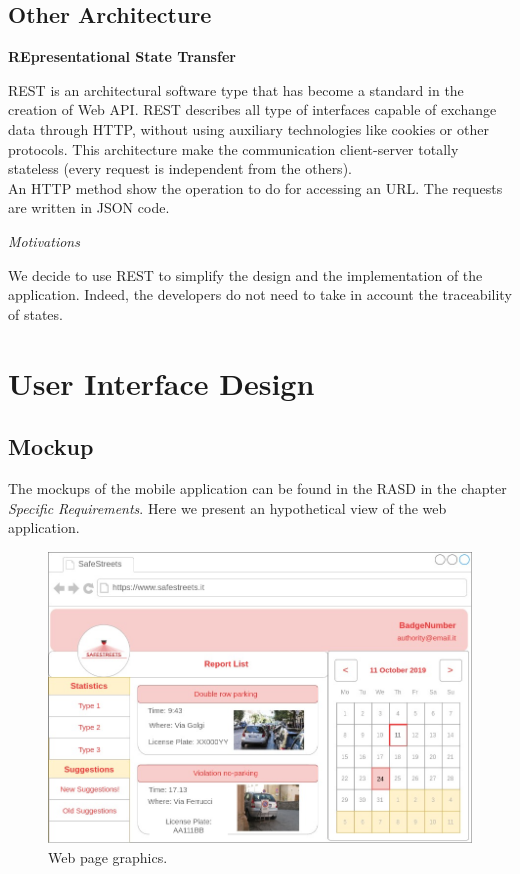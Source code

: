\documentclass{report}
\begin{document}
\section{Other Architecture}
\begin{center}\large{\textbf{REpresentational State Transfer}}\end{center}
REST is an architectural software type that has become a standard in the creation of Web API. REST describes all type of interfaces capable of exchange data through HTTP, without using auxiliary technologies like cookies or other protocols. This architecture make the communication client-server totally stateless (every request is independent from the others).\\ An HTTP method show the operation to do for accessing an URL. The requests are written in JSON code.
\begin{center}\large{\textit{Motivations}}\end{center}
We decide to use REST to simplify the design and the implementation of the application. Indeed, the developers do not need to take in account the traceability of states.

\chapter{User Interface Design}
\section{Mockup}
The mockups of the mobile application can be found in the RASD in the chapter \textit{Specific Requirements}. Here we present an hypothetical view of the web application.
\begin{figure}[!ht]
	\begin{center}
	\includegraphics[width=\textwidth]{img/MockupAppWeb.png}
	\end{center}
	\caption{Web page graphics.}
\end{figure}
\end{document}

